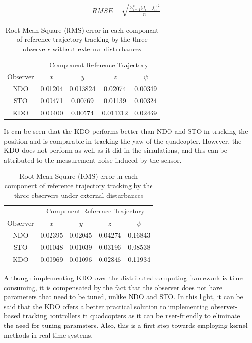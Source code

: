 \documentclass[letterpaper%
, twoside%
, 12pt%
,memoire%
, english%
,creativecommons,hyperref%
]{thETS}
\begin{document}
\begin{align}\label{eqn:rmse}
 RMSE = \sqrt{\frac{\Sigma_{i=1}^{n}{\big({d_i -f_i}\big)^2}}{n}}
\end{align}

\begin{table}
\parbox{0.65\textwidth}{\caption{Root Mean Square (RMS) error in each component of reference trajectory tracking by the three observers without external disturbances}\label{Tab:rmse}}
\begin{tabular}{|c|c|c|c|c|}
\hline
         & \multicolumn{4}{c|}{Component Reference Trajectory}\\\cline{2-5} 
Observer &   $x$   &  $y$     &   $z$    & $\psi$  \\ \hline
NDO      & 0.01204 & 0.013824 & 0.02074  & 0.00349 \\
STO      & 0.00471 & 0.00769  & 0.01139   & 0.00324 \\
KDO      & 0.00400 & 0.00574  & 0.011312 & 0.02469 \\
\hline
\end{tabular}
\end{table}

It can be seen that the KDO performs better than NDO and STO in tracking the position and is comparable in tracking the yaw of the quadcopter. However, the KDO does not perform as well as it did in the simulations, and this can be attributed to the measurement noise induced by the sensor. 

\begin{table}
\parbox{0.65\textwidth}{\caption{Root Mean Square (RMS) error in each component of reference trajectory tracking by the three observers under external disturbances}\label{Tab:rmseDist}}
\begin{tabular}{|c|c|c|c|c|}
\hline
         & \multicolumn{4}{c|}{Component Reference Trajectory}\\\cline{2-5} 
Observer &   $x$   &  $y$     &   $z$    & $\psi$  \\ \hline
NDO      & 0.02395 & 0.02045  & 0.04274  & 0.16843 \\
STO      & 0.01048 & 0.01039  & 0.03196  & 0.08538 \\
KDO      & 0.00969 & 0.01096  & 0.02846  & 0.11934 \\
\hline
\end{tabular}
\end{table}

Although implementing KDO over the distributed computing framework is time consuming, it is compensated by the fact that the observer does not have parameters that need to be tuned, unlike NDO and STO. In this light, it can be said that the KDO offers a better practical solution to implementing observer-based tracking controllers in quadcopters as it can be user-friendly to eliminate the need for tuning parameters. Also, this is a first step towards employing kernel methods in real-time systems. 
\end{document}
